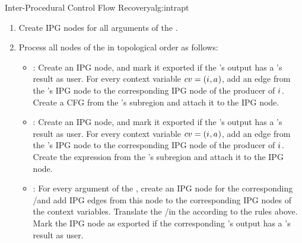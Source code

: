 \begin{informalg}{Inter-Procedural Control Flow Recovery}{alg:intrapt}
\begin{enumerate}
	\vspace*{-0.7\baselineskip}

	\item Create IPG nodes for all arguments of the \omegaregion.
	\item Process all nodes of the \omegaregion in topological order as follows:
		\begin{itemize}
			\item \bpoint{\lambdanodes}: Create an IPG node, and mark it exported if the
				\lambdanode's output has a \omegaregion's result as user. For every context variable
				$cv = (\mbox{$i_{}^{}$}, \mbox{$a_{}^{}$})$, add an edge from the \lambdanode's IPG node to the
				corresponding IPG node of the producer of $\mbox{$i_{}^{}$}$. Create a CFG from the \lambdanode's
				subregion and attach it to the IPG node.

			\item \bpoint{\deltanodes}: Create an IPG node, and mark it exported if the
				\deltanode's output has a \omegaregion's result as user. For every context variable
				$cv = (\mbox{$i_{}^{}$}, \mbox{$a_{}^{}$})$, add an edge from the \deltanode's IPG node to the
				corresponding IPG node of the producer of $\mbox{$i_{}^{}$}$. Create the expression from the
				\deltanode's subregion and attach it to the IPG node.

			\item \bpoint{\phinodes}: For every argument of the \phiregion, create an IPG node for
				the corresponding \deltam/\lambdanode and add IPG edges from this node to the
				corresponding IPG nodes of the context variables. Translate the \deltam/\lambdanodes in the
				\phiregion according to the rules above. Mark the IPG node as exported if the corresponding
				\phinode's output has a \omegaregion's result as user.
		\end{itemize}

	\vspace*{-\baselineskip}
\end{enumerate}
\end{informalg}

